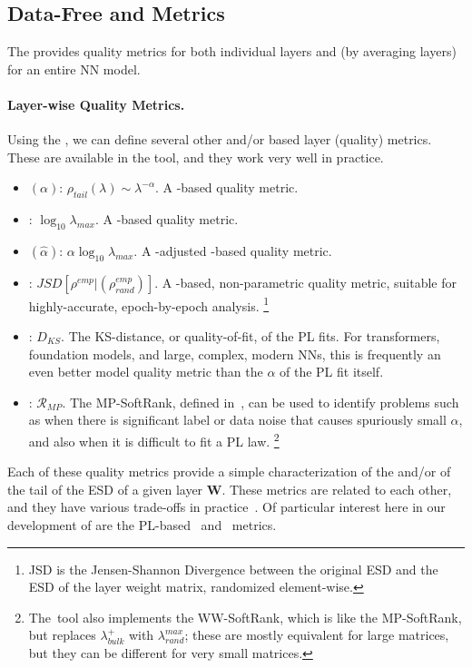 
\subsection{Data-Free \SHAPE and \SCALE \Quality Metrics}
\label{sxn:htsr-metics}

The \HTSR \Phenomenology provides quality metrics for both individual layers and (by averaging layers) for an entire NN model.

\paragraph{Layer-wise Quality Metrics.}
Using the \HTSR \Phenomenology, we can define several other \SHAPE and/or \SCALE based layer (quality) metrics.
These are available in the \WW tool, and they work very well in practice.
\begin{itemize}
\item 
\ALPHA 
$(\alpha)$: $\rho_{tail}(\lambda)\sim\lambda^{-\alpha}$. 
A \SHAPE-based quality metric.
\item
\LOGSPECTRALNORM: $\log_{10}\lambda_{max}$.
A \SCALE-based quality metric.
\item 
\ALPHAHAT 
$(\hat{\alpha})$: $\alpha\log_{10}\lambda_{max}$.
A \SCALE-adjusted \SHAPE-based quality metric.
\item
\RANDDIST: $JSD[\rho^{emp}|(\rho_{rand}^{emp})]$.
A \SHAPE-based, non-parametric quality metric, suitable for highly-accurate, epoch-by-epoch analysis.%
\footnote{JSD is the Jensen-Shannon Divergence between the original ESD and the ESD of the layer weight matrix, randomized element-wise.}
\item
\PLKS: $D_{KS}$.
The KS-distance, or quality-of-fit, of the PL fits.  
For transformers, foundation models, and large, complex, modern NNs, this is frequently an even better model quality metric than the $\alpha$ of the PL fit itself.
\item
\MPSOFTRANK: $\mathcal{R}_{MP}$.
The MP-SoftRank, defined in~\cite{MM18_TR_JMLRversion}, can be used to identify problems such as when there is significant label or data noise that causes spuriously small $\alpha$, and also when it is difficult to fit a PL law.%
\footnote{The~\WW tool also implements the WW-SoftRank, which is like the MP-SoftRank, but replaces $\lambda_{bulk}^{+}$ with $\lambda_{rand}^{max}$; these are mostly equivalent for large matrices, but they can be different for very small matrices.}
\end{itemize}

\noindent
Each of these quality metrics provide a simple characterization of the \SHAPE and/or \SCALE of the tail of the ESD of a given layer $\mathbf{W}$.
These metrics are related to each other, and they have various trade-offs in practice~\cite{MM20a_trends_NatComm, MM21a_simpsons_TR, YTHx23_KDD}.
Of particular interest here in our development of \SETOL are the PL-based \WW~\ALPHA and  \ALPHAHAT~metrics.


